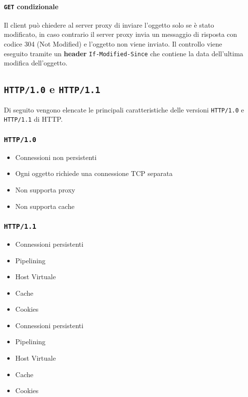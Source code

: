         \paragraph{\texttt{GET} condizionale} Il client può chiedere al server proxy di inviare l'oggetto solo se è stato modificato, in caso contrario il server proxy invia un messaggio di risposta con codice 304 (Not Modified) e l'oggetto non viene inviato. Il controllo viene eseguito tramite un \textbf{header} \texttt{If-Modified-Since} che contiene la data dell'ultima modifica dell'oggetto.
    \subsection[\texttt{HTTP/1.0} e \texttt{HTTP/1.1}]{\texttt{\Acrshort*{HTTP}/1.0} e \texttt{\Acrshort*{HTTP}/1.1}}
        Di seguito vengono elencate le principali caratteristiche delle versioni \texttt{\Acrshort*{HTTP}/1.0} e \texttt{\Acrshort*{HTTP}/1.1} di \Acrshort*{HTTP}.
        \subsubsection{\texttt{\Acrshort*{HTTP}/1.0}}
            \begin{itemize}
                \item Connessioni non persistenti
                \item Ogni oggetto richiede una connessione TCP separata
                \item Non supporta proxy
                \item Non supporta cache
            \end{itemize}
        \subsubsection{\texttt{\Acrshort*{HTTP}/1.1}}
            \begin{itemize}
                \item Connessioni persistenti
                \item Pipelining
                \item Host Virtuale
                \item Cache
                \item Cookies
                \item Connessioni persistenti
                \item Pipelining
                \item Host Virtuale
                \item Cache
                \item Cookies
            \end{itemize}
